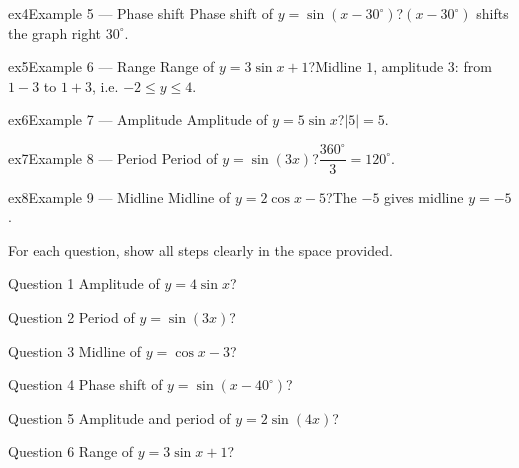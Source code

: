 \documentclass[11pt]{article}
\begin{document}
\begin{example}{ex4}{Example 5 --- Phase shift}
Phase shift of $y=\sin(x-30^\circ)$?\soln $(x-30^\circ)$ shifts the graph right $30^\circ$.
\end{example}

\begin{example}{ex5}{Example 6 --- Range}
Range of $y=3\sin x+1$?\soln Midline $1$, amplitude $3$: from $1-3$ to $1+3$, i.e. $-2\le y\le4$.
\end{example}

\begin{example}{ex6}{Example 7 --- Amplitude}
Amplitude of $y=5\sin x$?\soln $|5|=5$.
\end{example}

\begin{example}{ex7}{Example 8 --- Period}
Period of $y=\sin(3x)$?\soln $\dfrac{360^\circ}{3}=120^\circ$.
\end{example}

\begin{example}{ex8}{Example 9 --- Midline}
Midline of $y=2\cos x-5$?\soln The $-5$ gives midline $y=-5$.
\end{example}

\clearpage
{}
For each question, show all steps clearly in the space provided.

\begin{qbox}{Question 1}
Amplitude of $y=4\sin x$?\workspace{2.4cm}
\end{qbox}

\begin{qbox}{Question 2}
Period of $y=\sin(3x)$?\workspace{2.4cm}
\end{qbox}

\begin{qbox}{Question 3}
Midline of $y=\cos x-3$?\workspace{2.4cm}
\end{qbox}

\begin{qbox}{Question 4}
Phase shift of $y=\sin(x-40^\circ)$?\workspace{2.4cm}
\end{qbox}

\begin{qbox}{Question 5}
Amplitude and period of $y=2\sin(4x)$?\workspace{2.6cm}
\end{qbox}

\begin{qbox}{Question 6}
Range of $y=3\sin x+1$?\workspace{2.4cm}
\end{qbox}
\end{document}

